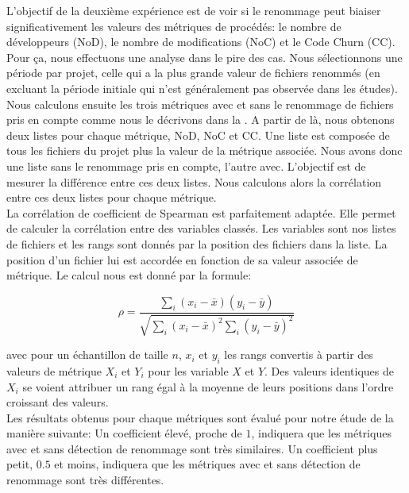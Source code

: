 L'objectif de la deuxième expérience est de voir si le renommage peut biaiser significativement les valeurs des métriques de procédés: le nombre de développeurs (NoD), le nombre de modifications (NoC) et le Code Churn (CC). Pour ça, nous effectuons une analyse dans le pire des cas. Nous sélectionnons une période par projet, celle qui a la plus grande valeur de fichiers renommés (en excluant la période initiale qui n'est généralement pas observée dans les études).\\ 

Nous calculons ensuite les trois métriques avec et sans le renommage de fichiers pris en compte comme nous le décrivons dans la . A partir de là, nous obtenons deux listes pour chaque métrique, NoD, NoC et CC. Une liste est composée de tous les fichiers du projet plus la valeur de la métrique associée. Nous avons donc une liste sans le renommage pris en compte, l'autre avec. L'objectif est de mesurer la différence entre ces deux listes. Nous calculons alors la corrélation entre ces deux listes pour chaque métrique.\\ 


La corrélation de coefficient de Spearman est parfaitement adaptée. Elle permet de calculer la corrélation entre des variables classés. Les variables sont nos listes de fichiers et les rangs sont donnés par la position des fichiers dans la liste. La position d'un fichier lui est accordée en fonction de sa valeur associée de métrique. Le calcul nous est donné par la formule: 

\[ \rho = \frac{\sum_{i}(x_{i} - \bar{x})(y_{i} - \bar{y})}{ \sqrt{ \sum_{i}(x_{i} - \bar{x})^2\sum_{i}(y_{i} - \bar{y})^2 } } \]

avec pour un échantillon de taille $n$, $x_{i}$ et $y_{i}$ les rangs convertis à partir des valeurs de métrique $X_{i}$ et $Y_{i}$ pour les variable $X$ et $Y$.
Des valeurs identiques de $X_i$ se voient attribuer un rang égal à la moyenne de leurs positions dans l'ordre croissant des valeurs.\\

Les résultats obtenus pour chaque métriques sont évalué pour notre étude de la manière suivante: Un coefficient élevé, proche de $1$, indiquera que les métriques avec et sans détection de renommage sont très similaires. Un coefficient plus petit, $0.5$ et moins, indiquera que les métriques avec et sans détection de renommage sont très différentes.\\  
